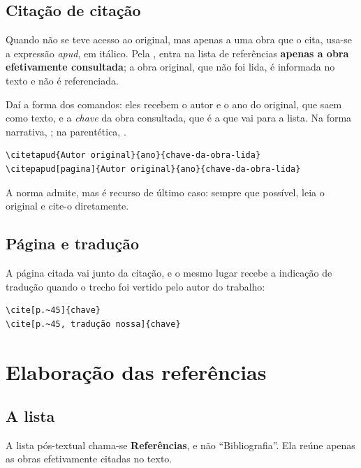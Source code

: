 \documentclass[dsc]{ufrj}
\begin{document}
  \section{Citação de citação}

  Quando não se teve acesso ao original, mas apenas a uma obra que o cita, usa-se
  a expressão \emph{apud}, em itálico. Pela , entra na lista de
  referências \textbf{apenas a obra efetivamente consultada}; a obra original,
  que não foi lida, é informada no texto e não é referenciada.

  Daí a forma dos comandos: eles recebem o autor e o ano do original, que saem
  como texto, e a \emph{chave} da obra consultada, que é a que vai para a lista.
  Na forma narrativa, ; na
  parentética, .

\begin{verbatim}
\citetapud{Autor original}{ano}{chave-da-obra-lida}
\citepapud[pagina]{Autor original}{ano}{chave-da-obra-lida}
\end{verbatim}

  A norma admite, mas é recurso de último caso: sempre que possível, leia o
  original e cite-o diretamente.

  \section{Página e tradução}

  A página citada vai junto da citação, e o mesmo lugar recebe a indicação de
  tradução quando o trecho foi vertido pelo autor do trabalho:

\begin{verbatim}
\cite[p.~45]{chave}
\cite[p.~45, tradução nossa]{chave}
\end{verbatim}

  \chapter{Elaboração das referências}\label{cap:referencias}

  \section{A lista}

  A lista pós-textual chama-se \textbf{Referências}, e não ``Bibliografia''. Ela
  reúne apenas as obras efetivamente citadas no texto.
\end{document}
